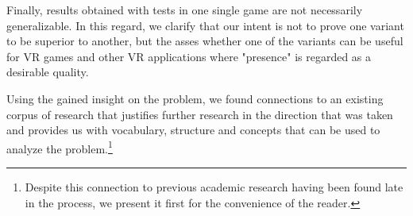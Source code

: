 Finally, results obtained with tests in one single game are not necessarily generalizable. In this regard, we clarify that our intent is not to prove one variant to be superior to another, but the asses whether one of the variants can be useful for VR games and other VR applications where "presence" is regarded as a desirable quality.

Using the gained insight on the problem, we found connections to an existing corpus of research that justifies further research in the direction that was taken and provides us with vocabulary, structure and concepts that can be used to analyze the problem.\footnote{Despite this connection to previous academic research having been found late in the process, we present it first for the convenience of the reader.}